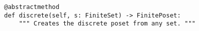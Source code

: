 \begin{verbatim}
@abstractmethod
def discrete(self, s: FiniteSet) -> FinitePoset:
    """ Creates the discrete poset from any set. """
\end{verbatim}
